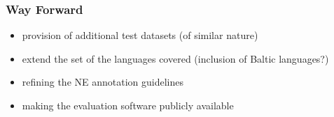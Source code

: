 \documentclass{beamer}
\begin{document}
\begin{frame}
 \frametitle{Way Forward}

\begin{itemize}

\item provision of additional test datasets (of similar nature)

\vspace{0.2cm}

\item extend the set of the languages covered (inclusion of Baltic languages?)

\vspace{0.2cm}

\item refining the NE annotation guidelines

\vspace{0.2cm}

\item making the evaluation software publicly available

\end{itemize}

\end{frame}
\end{document}
